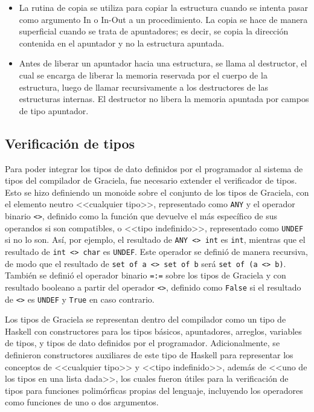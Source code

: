 {{\begin{itemize}
  \item La rutina de copia se utiliza para copiar la estructura cuando se
  intenta pasar como argumento In o In-Out a un procedimiento. La copia se hace
  de manera superficial cuando se trata de apuntadores; es decir, se copia la
  dirección contenida en el apuntador y no la estructura apuntada.

  \item Antes de liberar un apuntador hacia una estructura, se llama al
  destructor, el cual se encarga de liberar la memoria reservada por el cuerpo
  de la estructura, luego de llamar recursivamente a los destructores de las
  estructuras internas. El destructor no libera la memoria apuntada por campos
  de tipo apuntador.

\end{itemize}


\subsection{Verificación de tipos}

Para poder integrar los tipos de dato definidos por el programador al sistema
de tipos del compilador de Graciela, fue necesario extender el verificador de
tipos. Esto se hizo definiendo un monoide sobre el conjunto de los tipos de
Graciela, con el elemento neutro <<cualquier tipo>>, representado como
\texttt{ANY} y el operador binario \texttt{<>}, definido como la función que
devuelve el más específico de sus operandos si son compatibles, o <<tipo
indefinido>>, representado como \texttt{UNDEF} si no lo son. Así, por ejemplo,
el resultado de \texttt{ANY <>{} int} es \texttt{int}, mientras que el resultado
de \texttt{int <>{} char} es \texttt{UNDEF}. Este operador se definió de manera
recursiva, de modo que el resultado de \texttt{set of a <>{} set of b} será
\texttt{set of (a <>{} b)}. También se definió el operador binario \texttt{=:=}
sobre los tipos de Graciela y con resultado booleano a partir del operador
\texttt{<>}, definido como \texttt{False} si el resultado de \texttt{<>} es
\texttt{UNDEF} y \texttt{True} en caso contrario.

Los tipos de Graciela se representan dentro del compilador como un
tipo de Haskell con constructores para los tipos básicos, apuntadores, arreglos,
variables de tipos, y tipos de dato definidos por el programador.
Adicionalmente, se definieron constructores auxiliares de este tipo de Haskell
para representar los conceptos de <<cualquier tipo>> y <<tipo indefinido>>,
además de <<uno de los tipos en una lista dada>>, los cuales fueron útiles para
la verificación de tipos para funciones polimórficas propias del lenguaje,
incluyendo los operadores como funciones de uno o dos argumentos.

}}

